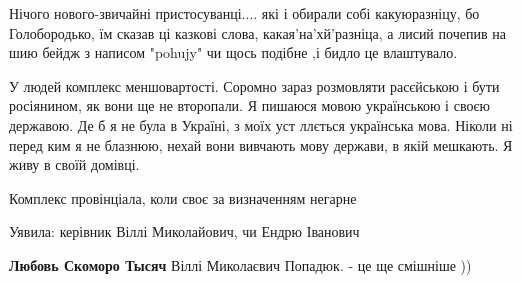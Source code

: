 \begin{itemize}
 

Нічого нового-звичайні пристосуванці.... які і обирали собі какуюразніцу, бо
Голобородько, їм сказав ці казкові слова, какая'на'хй'разніца, а лисий почепив
на шию бейдж з написом "pohujy" чи щось подібне ,і бидло це влаштувало.


 

У людей комплекс меншовартості. Соромно зараз розмовляти расєйською і бути
росіянином, як вони ще не второпали.  Я пишаюся мовою українською і своєю
державою. Де б я не була в Україні, з моїх уст ллється українська мова. Ніколи ні
перед ким я не блазнюю, нехай вони вивчають мову держави, в якій мешкають. Я
живу в своїй домівці.

 
Комплекс провінціала, коли своє за визначенням негарне

 
Уявила: керівник Віллі Миколайович, чи Ендрю Іванович🤔😥

\begin{itemize}
 
\textbf{Любовь Скоморо Тысяч} Віллі Миколаєвич Попадюк. - це ще смішніше ))

 

\end{itemize}
\end{itemize}
